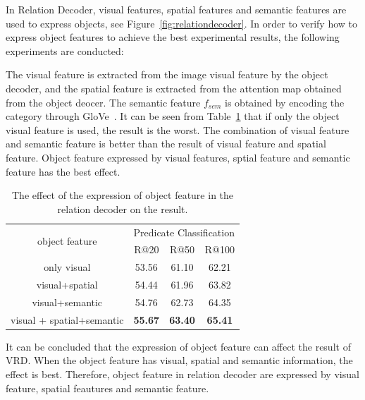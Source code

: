 In Relation Decoder, visual features, spatial features and semantic features are used to express objects, see Figure~\ref{fig:relationdecoder}. In order to verify how to express object features to achieve the best experimental results, the following experiments are conducted:

The visual feature is extracted from the image visual feature by the object decoder, and the spatial feature is extracted from the attention map obtained from the object deocer. The semantic feature $f_{sem}$ is obtained by encoding the category through GloVe~\cite{pennington2014glove}. It can be seen from Table~\ref{tab:relation_object} that if only the object visual feature is used, the result is the worst. The combination of visual feature and semantic feature is better than the result of visual feature and spatial feature. Object feature expressed by visual features, sptial feature and semantic feature has the best effect.

\begin{table}[]
	\centering
	\begin{tabular}{c|ccc}
		\hline
		\multirow{2}{*}{object feature} & \multicolumn{3}{c}{Predicate Classification}    \\ \cline{2-4} 
		& R@20           & R@50           & R@100          \\ \hline
		only visual              & 53.56          & 61.10          & 62.21          \\
		visual+spatial                   & 54.44          & 61.96          & 63.82          \\
		visual+semantic                 & 54.76          & 62.73          & 64.35          \\
		visual + spatial+semantic        & \textbf{55.67} & \textbf{63.40} & \textbf{65.41} \\  \hline
	\end{tabular}
	\caption[The effect of the expression of object feature in the relation decoder on the result]{The effect of the expression of object feature in the relation decoder on the result.}%
	\label{tab:relation_object}
\end{table}

It can be concluded that the expression of object feature can affect the result of VRD. When the object feature has visual, spatial and semantic information, the effect is best. Therefore, object feature in relation decoder are expressed by visual feature, spatial feautures and semantic feature.

